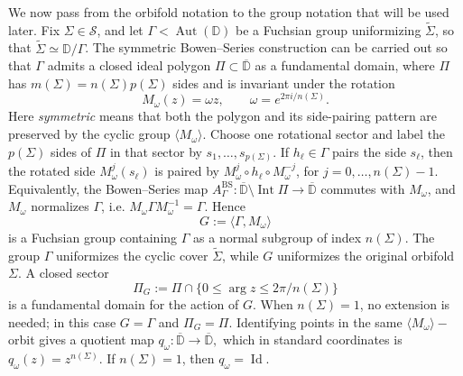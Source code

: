 \documentclass[11pt,a4paper, oneside]{amsart}
\theoremstyle{definition}
\theoremstyle{remark}
\DeclareMathOperator{\Aut}{Aut}
\numberwithin{equation}{section}
\DeclareMathOperator{\Id}{Id}
\def\D{{\mathbb{D}}}
\renewcommand{\leq}{\leqslant}
\begin{document}
We now pass from the orbifold notation to the group notation that will be used
later.  Fix $\Sigma\in\mathscr S$, and let $\Gamma<\Aut(\D)$ be a Fuchsian
group uniformizing $\widetilde\Sigma$, so that
$\widetilde\Sigma\simeq\D/\Gamma$.  The symmetric Bowen--Series construction
can be carried out so that $\Gamma$ admits a closed ideal polygon
$\Pi\subset\overline\D$ as a fundamental domain, where $\Pi$ has
$m(\Sigma)=n(\Sigma)p(\Sigma)$ sides and is invariant under the rotation
\[
M_\omega(z)=\omega z,
\qquad
\omega=e^{2\pi i/n(\Sigma)}.
\]
Here \emph{symmetric} means that both the polygon and its side-pairing pattern
are preserved by the cyclic group $\langle M_\omega\rangle$.  Choose one
rotational sector and label the $p(\Sigma)$ sides of $\Pi$ in that sector by
$s_1,\ldots,s_{p(\Sigma)}$.  If $h_\ell\in\Gamma$ pairs the side $s_\ell$, then
the rotated side $M_\omega^j(s_\ell)$ is paired by
$M_\omega^j\circ h_\ell\circ M_\omega^{-j}$, for
$j=0,\ldots,n(\Sigma)-1$.  Equivalently, the Bowen--Series map
$A^{\mathrm{BS}}_\Gamma:
\overline{\D}\setminus \operatorname{Int}\Pi
\longrightarrow
\overline{\D}$
commutes with $M_\omega$, and $M_\omega$ normalizes $\Gamma$, i.e.
$M_\omega\Gamma M_\omega^{-1}=\Gamma$.  Hence
\[
G:=\langle \Gamma,M_\omega\rangle
\]
is a Fuchsian group containing $\Gamma$ as a normal subgroup of index
$n(\Sigma)$.  The group $\Gamma$ uniformizes the cyclic cover
$\widetilde\Sigma$, while $G$ uniformizes the original orbifold $\Sigma$.  A
closed sector
\[
\Pi_G:=\Pi\cap \{0\leq \arg z\leq 2\pi/n(\Sigma)\}
\]
is a fundamental domain for the action of $G$.  When $n(\Sigma)=1$, no
extension is needed; in this case $G=\Gamma$ and $\Pi_G=\Pi$. Identifying points in the same $\langle M_\omega\rangle-$orbit gives a quotient
map
$
q_\omega:\overline{\D}\longrightarrow\overline{\D},
$
which in standard coordinates is $q_\omega(z)=z^{n(\Sigma)}$.  If
$n(\Sigma)=1$, then $q_\omega=\Id$.
\end{document}
